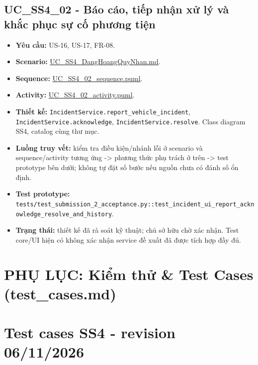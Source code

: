 \documentclass[11pt,a4paper]{article}
\providecommand{\tightlist}{%
  \setlength{\itemsep}{0pt}\setlength{\parskip}{0pt}}
\begin{document}
\hypertarget{uc_ss4_02---buxe1o-cuxe1o-tiux1ebfp-nhux1eadn-xux1eed-luxfd-vuxe0-khux1eafc-phux1ee5c-sux1ef1-cux1ed1-phux1b0ux1a1ng-tiux1ec7n}{%
\subsection{UC\_SS4\_02 - Báo cáo, tiếp nhận xử lý và khắc phục sự cố
phương
tiện}\label{uc_ss4_02---buxe1o-cuxe1o-tiux1ebfp-nhux1eadn-xux1eed-luxfd-vuxe0-khux1eafc-phux1ee5c-sux1ef1-cux1ed1-phux1b0ux1a1ng-tiux1ec7n}}

\begin{itemize}
\tightlist
\item
  \textbf{Yêu cầu:} US-16, US-17, FR-08.
\item
  \textbf{Scenario:}
  \href{../../../../docs/diagrams/Use-case\%20detail-scenario/SS4/Usecase\%20scenario/UC_SS4_DangHoangQuyNhan.md}{UC\_SS4\_DangHoangQuyNhan.md}.
\item
  \textbf{Sequence:}
  \href{../../../../docs/diagrams/Use-case\%20detail-scenario/SS4/Sequence\%20diagrams/UC_SS4_02_sequence.puml}{UC\_SS4\_02\_sequence.puml}.
\item
  \textbf{Activity:}
  \href{../../../../docs/diagrams/Use-case\%20detail-scenario/SS4/Activity\%20diagrams/UC_SS4_02_activity.puml}{UC\_SS4\_02\_activity.puml}.
\item
  \textbf{Thiết kế:} \texttt{IncidentService.report\_vehicle\_incident},
  \texttt{IncidentService.acknowledge},
  \texttt{IncidentService.resolve}. Class diagram SS4, catalog cùng thư
  mục.
\item
  \textbf{Luồng truy vết:} kiểm tra điều kiện/nhánh lỗi ở scenario và
  sequence/activity tương ứng -\textgreater{} phương thức phụ trách ở
  trên -\textgreater{} test prototype bên dưới; không tự đặt số bước nếu
  nguồn chưa có đánh số ổn định.
\item
  \textbf{Test prototype:}
  \texttt{tests/test\_submission\_2\_acceptance.py::test\_incident\_ui\_report\_acknowledge\_resolve\_and\_history}.
\item
  \textbf{Trạng thái:} thiết kế đã rà soát kỹ thuật; chủ sở hữu chờ xác
  nhận. Test core/UI hiện có không xác nhận service đề xuất đã được tích
  hợp đầy đủ.
\end{itemize}

\newpage
\section*{PHỤ LỤC: Kiểm thử \& Test Cases (test\_cases.md)}
\hypertarget{test-cases-ss4---revision-06112026}{%
\section{Test cases SS4 - revision
06/11/2026}\label{test-cases-ss4---revision-06112026}}
\end{document}

